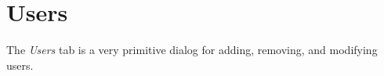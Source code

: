 \section{Users}
The \emph{Users} tab is a very primitive dialog for adding, removing, and 
modifying users.

